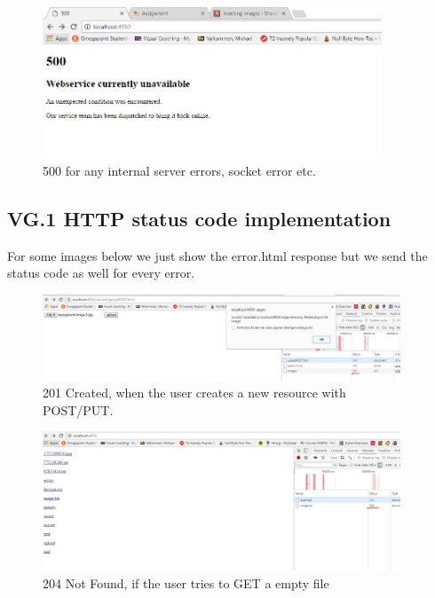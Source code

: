 \documentclass[a4paper,12pt]{article}
\numberwithin{figure}{section}
\begin{document}
\begin{figure}[h!]
	\centering
	\label{Server error}
	\includegraphics[width=0.90\textwidth,keepaspectratio]{img/500.jpg} 
	\caption{500 for any internal server errors, socket error etc.}
\end{figure}

\newpage
\subsection{VG.1 HTTP status code implementation}

For some images below we just show the error.html response but we send the status code as well for every error.

\begin{figure}[h!]
	\centering
	\label{201}
	\includegraphics[width=0.95\textwidth,keepaspectratio]{img/201.jpg} 
	\caption{201 Created, when the user creates a new resource with POST/PUT.}
\end{figure}

\begin{figure}[h!]
	\centering
	\label{204}
	\includegraphics[width=0.95\textwidth,keepaspectratio]{img/204.jpg} 
	\caption{204 Not Found, if the user tries to GET a empty file}
\end{figure}
\end{document}
